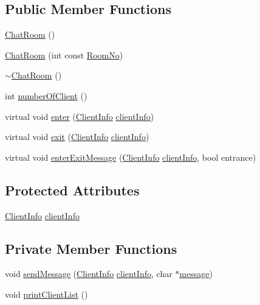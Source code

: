 \subsection*{Public Member Functions}
\begin{DoxyCompactItemize}
\item 
\hyperlink{class_chat_room_aa0e11ef30553586ac297813d35975be6}{Chat\+Room} ()
\item 
\hyperlink{class_chat_room_aff242030ddeed2bda2de4aeeaaa406f7}{Chat\+Room} (int const \hyperlink{class_chat_room_a505faca8089f97a821373d10dcb6b5a5}{Room\+No})
\item 
\hyperlink{class_chat_room_aace70d1b33b9e4c786e2df266f81591d}{$\sim$\+Chat\+Room} ()
\item 
int \hyperlink{class_chat_room_a636f2d04babf1b9f797d88dacd414f90}{number\+Of\+Client} ()
\item 
virtual void \hyperlink{class_room_af6369792216d4f6d8dc14c27fbe8218b}{enter} (\hyperlink{class_client_info}{Client\+Info} \hyperlink{class_room_a4dd1160fe55a497f7349488d934b1805}{client\+Info})
\item 
virtual void \hyperlink{class_room_a85bb6bc37f4caff36854e38cf659df62}{exit} (\hyperlink{class_client_info}{Client\+Info} \hyperlink{class_room_a4dd1160fe55a497f7349488d934b1805}{client\+Info})
\item 
virtual void \hyperlink{class_room_a463a61c145c7609cfc3433cb201ad71f}{enter\+Exit\+Message} (\hyperlink{class_client_info}{Client\+Info} \hyperlink{class_room_a4dd1160fe55a497f7349488d934b1805}{client\+Info}, bool entrance)
\end{DoxyCompactItemize}
\subsection*{Protected Attributes}
\begin{DoxyCompactItemize}
\item 
\hyperlink{class_client_info}{Client\+Info} \hyperlink{class_room_a4dd1160fe55a497f7349488d934b1805}{client\+Info}
\end{DoxyCompactItemize}
\subsection*{Private Member Functions}
\begin{DoxyCompactItemize}
\item 
void \hyperlink{class_chat_room_a36b6e5f9a48c32bb86a73ef1bab2c1c9}{send\+Message} (\hyperlink{class_client_info}{Client\+Info} \hyperlink{class_room_a4dd1160fe55a497f7349488d934b1805}{client\+Info}, char $\ast$\hyperlink{class_chat_room_a5bed055c0efb5c1686f9b2f8d0d6e872}{message})
\item 
void \hyperlink{class_chat_room_a2c1ad9dbd9e42b727cdf1e1ae8d39f33}{print\+Client\+List} ()
\end{DoxyCompactItemize}
